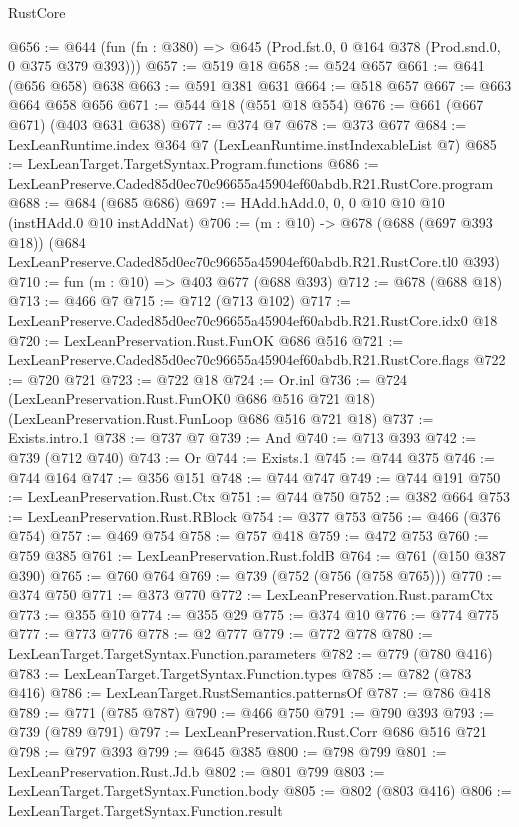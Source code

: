 \begin{lexlean}{RustCore}
\begin{coremodule}
@656 := @644 (fun (fn : @380) => @645 (Prod.fst.{0, 0} @164 @378 (Prod.snd.{0, 0} @375 @379 @393)))
@657 := @519 @18
@658 := @524 @657
@661 := @641 (@656 @658) @638
@663 := @591 @381 @631
@664 := @518 @657
@667 := @663 @664 @658 @656
@671 := @544 @18 (@551 @18 @554)
@676 := @661 (@667 @671) (@403 @631 @638)
@677 := @374 @7
@678 := @373 @677
@684 := LexLeanRuntime.index @364 @7 (LexLeanRuntime.instIndexableList @7)
@685 := LexLeanTarget.TargetSyntax.Program.functions
@686 := LexLeanPreserve.Caded85d0ec70c96655a45904ef60abdb.R21.RustCore.program
@688 := @684 (@685 @686)
@697 := HAdd.hAdd.{0, 0, 0} @10 @10 @10 (instHAdd.{0} @10 instAddNat)
@706 := (m : @10) ->
  @678
    (@688 (@697 @393 @18))
    (@684 LexLeanPreserve.Caded85d0ec70c96655a45904ef60abdb.R21.RustCore.tl0 @393)
@710 := fun (m : @10) => @403 @677 (@688 @393)
@712 := @678 (@688 @18)
@713 := @466 @7
@715 := @712 (@713 @102)
@717 := LexLeanPreserve.Caded85d0ec70c96655a45904ef60abdb.R21.RustCore.idx0 @18
@720 := LexLeanPreservation.Rust.FunOK @686 @516
@721 := LexLeanPreserve.Caded85d0ec70c96655a45904ef60abdb.R21.RustCore.flags
@722 := @720 @721
@723 := @722 @18
@724 := Or.inl
@736 := @724
    (LexLeanPreservation.Rust.FunOK0 @686 @516 @721 @18)
    (LexLeanPreservation.Rust.FunLoop @686 @516 @721 @18)
@737 := Exists.intro.{1}
@738 := @737 @7
@739 := And
@740 := @713 @393
@742 := @739 (@712 @740)
@743 := Or
@744 := Exists.{1}
@745 := @744 @375
@746 := @744 @164
@747 := @356 @151
@748 := @744 @747
@749 := @744 @191
@750 := LexLeanPreservation.Rust.Ctx
@751 := @744 @750
@752 := @382 @664
@753 := LexLeanPreservation.Rust.RBlock
@754 := @377 @753
@756 := @466 (@376 @754)
@757 := @469 @754
@758 := @757 @418
@759 := @472 @753
@760 := @759 @385
@761 := LexLeanPreservation.Rust.foldB
@764 := @761 (@150 @387 @390)
@765 := @760 @764
@769 := @739 (@752 (@756 (@758 @765)))
@770 := @374 @750
@771 := @373 @770
@772 := LexLeanPreservation.Rust.paramCtx
@773 := @355 @10
@774 := @355 @29
@775 := @374 @10
@776 := @774 @775
@777 := @773 @776
@778 := @2 @777
@779 := @772 @778
@780 := LexLeanTarget.TargetSyntax.Function.parameters
@782 := @779 (@780 @416)
@783 := LexLeanTarget.TargetSyntax.Function.types
@785 := @782 (@783 @416)
@786 := LexLeanTarget.RustSemantics.patternsOf
@787 := @786 @418
@789 := @771 (@785 @787)
@790 := @466 @750
@791 := @790 @393
@793 := @739 (@789 @791)
@797 := LexLeanPreservation.Rust.Corr @686 @516 @721
@798 := @797 @393
@799 := @645 @385
@800 := @798 @799
@801 := LexLeanPreservation.Rust.Jd.b
@802 := @801 @799
@803 := LexLeanTarget.TargetSyntax.Function.body
@805 := @802 (@803 @416)
@806 := LexLeanTarget.TargetSyntax.Function.result

\end{coremodule}
\end{lexlean}
